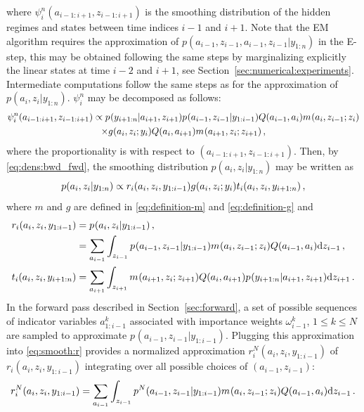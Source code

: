 where $\psi^n_{i}(a_{i-1:i+1},z_{i-1:i+1})$ is the smoothing distribution of the hidden regimes and states between time indices $i-1$ and $i+1$. Note that the EM algorithm requires the approximation of $p(a_{i-1},z_{i-1},a_{i-1},z_{i-1}|y_{1:n})$ in the E-step, this may be obtained following the same steps by marginalizing explicitly the linear states at time $i-2$ and $i+1$, see Section~\ref{sec:numerical:experiments}. Intermediate computations follow the same steps as  for the approximation of $p(a_{i},z_{i}|y_{1:n})$. $\psi^n_{i}$ may be decomposed as follows:
\begin{multline*}
\psi^n_{i}(a_{i-1:i+1},z_{i-1:i+1}) \propto p_{}(y_{i+1:n}|a_{i+1},z_{i+1})p_{}(a_{i-1},z_{i-1}|y_{1:i-1})Q(a_{i-1},a_{i})m_{}(a_{i},z_{i-1};z_{i})\\
\times g_{}(a_{i},z_{i};y_{i})Q(a_{i},a_{i+1})m_{}(a_{i+1},z_{i};z_{i+1})\,,
\end{multline*}
where the proportionality is with respect to $(a_{i-1:i+1},z_{i-1:i+1})$. Then, by \eqref{eq:dens:bwd_fwd}, the smoothing distribution $p(a_{i},z_{i}|y_{1:n}) $ may be written as
\begin{equation}
\label{eq:smoothing}
p(a_{i},z_{i}|y_{1:n})   \propto r_{i}(a_{i},z_{i},y_{1:i-1})g_{}(a_{i},z_{i};y_{i})t_{i}(a_i,z_i,y_{i+1:n})\,,
\end{equation}
where $m$ and $g$ are defined in \eqref{eq:definition-m} and \eqref{eq:definition-g} and
\begin{align}
r_{i}(a_{i},z_{i},y_{1:i-1}) &= p_{}(a_{i},z_{i}|y_{1:i-1})\,,\\
&=\sum_{a_{i-1}}\int_{z_{i-1}}p_{}(a_{i-1},z_{i-1}|y_{1:i-1})m_{}(a_{i},z_{i-1};z_{i})Q(a_{i-1},a_{i}) \mathrm{d} z_{i-1}\,,\label{eq:smooth:r}\\
t_{i}(a_i,z_i,y_{i+1:n}) &= \sum_{a_{i+1}}\int_{z_{i+1}}m_{}(a_{i+1},z_{i};z_{i+1})Q(a_{i},a_{i+1})p_{}(y_{i+1:n}|a_{i+1},z_{i+1}) \mathrm{d} z_{i+1}\,.\label{eq:smooth:t}
\end{align}
In the forward pass described in Section~\ref{sec:forward}, a set of possible sequences of indicator variables $a_{1:i-1}^k$ associated with importance weights $\omega_{i-1}^k$, $1\le k\le N$ are sampled to approximate $p_{}(a_{i-1},z_{i-1}|y_{1:i-1})$.
Plugging this approximation into \eqref{eq:smooth:r} provides a normalized approximation $r^N_{i}(a_{i},z_{i},y_{1:i-1})$ of $r_{i}(a_{i},z_{i},y_{1:i-1})$ integrating over all possible choices of $(a_{i-1},z_{i-1})$:
\[
r^N_{i}(a_{i},z_{i},y_{1:i-1}) = \sum_{a_{i-1}}\int_{z_{i-1}}p^N_{}(a_{i-1},z_{i-1}|y_{1:i-1})m_{}(a_{i},z_{i-1};z_{i})Q(a_{i-1},a_{i}) \mathrm{d} z_{i-1}\,.
\]
